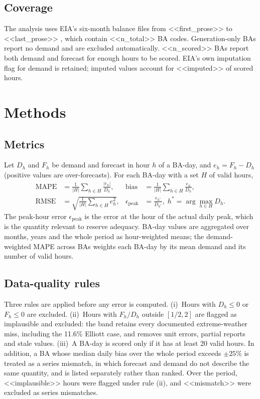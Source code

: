 \documentclass[conference]{IEEEtran}
\begin{document}
\subsection{Coverage}
The analysis uses EIA's six-month balance files from <<first_prose>> to <<last_prose>> \cite{eia930monitor}, which contain <<n_total>> BA codes. Generation-only BAs report no demand and are excluded automatically. <<n_scored>> BAs report both demand and forecast for enough hours to be scored. EIA's own imputation flag for demand is retained; imputed values account for <<imputed>> of scored hours.

\section{Methods}
\subsection{Metrics}
Let $D_h$ and $F_h$ be demand and forecast in hour $h$ of a BA-day, and $e_h = F_h - D_h$ (positive values are over-forecasts). For each BA-day with a set $H$ of valid hours,
\begin{align}
\mathrm{MAPE} &= \frac{1}{|H|}\sum_{h\in H} \frac{|e_h|}{D_h}, &
\mathrm{bias} &= \frac{1}{|H|}\sum_{h\in H} \frac{e_h}{D_h}, \\
\mathrm{RMSE} &= \sqrt{\frac{1}{|H|}\sum_{h\in H} e_h^2}, &
\epsilon_{\mathrm{peak}} &= \frac{e_{h^\ast}}{D_{h^\ast}},\; h^\ast = \arg\max_{h\in H} D_h .
\end{align}
The peak-hour error $\epsilon_{\mathrm{peak}}$ is the error at the hour of the actual daily peak, which is the quantity relevant to reserve adequacy. BA-day values are aggregated over months, years and the whole period as hour-weighted means; the demand-weighted MAPE across BAs weights each BA-day by its mean demand and its number of valid hours.

\subsection{Data-quality rules}
Three rules are applied before any error is computed. (i)~Hours with $D_h \le 0$ or $F_h \le 0$ are excluded. (ii)~Hours with $F_h/D_h$ outside $[1/2, 2]$ are flagged as implausible and excluded: the band retains every documented extreme-weather miss, including the 11.6\% Elliott case, and removes unit errors, partial reports and stale values. (iii)~A BA-day is scored only if it has at least 20 valid hours. In addition, a BA whose median daily bias over the whole period exceeds $\pm 25\%$ is treated as a series mismatch, in which forecast and demand do not describe the same quantity, and is listed separately rather than ranked. Over the period, <<implausible>> hours were flagged under rule (ii), and <<mismatch>> were excluded as series mismatches.
\end{document}
